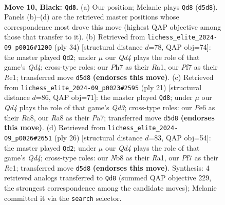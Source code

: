 \documentclass[11pt]{article}
\begin{document}
\clearpage

\begin{figure}[p]\centering
\begin{subfigure}{0.46\textwidth}\centering
\resizebox{\linewidth}{!}{%
\newchessgame
\chessboard[
  setfen={rnb2rk1/pp3ppp/4p3/2pq3n/2PP4/3BPN2/P4PPP/R1BQ1RK1 b - - 0 10},
  showmover=false,
  pgfstyle=straightmove, color=movearrow, markmove={d5-d8}
]}
\caption{}
\end{subfigure}\hfill
\begin{subfigure}{0.46\textwidth}\centering
\resizebox{\linewidth}{!}{%
\newchessgame
\chessboard[
  setfen={rq3rk1/1p1n1ppp/p1bp4/P3p3/3QP3/2N3P1/1PP2PBP/R3R1K1 w - - 0 18},
  showmover=false,
  pgfstyle=straightmove, color=movearrow, markmove={d4-d2}
]}
\caption{}
\end{subfigure}
\\[4pt]
\begin{subfigure}{0.46\textwidth}\centering
\resizebox{\linewidth}{!}{%
\newchessgame
\chessboard[
  setfen={r1b2rk1/ppp1ppbp/3q1np1/1BP5/3P4/5N1P/PP3PP1/R1BQ1RK1 b - - 0 11},
  showmover=false,
  pgfstyle=straightmove, color=movearrow, markmove={d6-d8}
]}
\caption{}
\end{subfigure}\hfill
\begin{subfigure}{0.46\textwidth}\centering
\resizebox{\linewidth}{!}{%
\newchessgame
\chessboard[
  setfen={r2q1rk1/1bpn1ppp/p2p1b2/1p6/3QPB2/2N2B1P/PPP2PP1/R3R1K1 w - - 6 14},
  showmover=false,
  pgfstyle=straightmove, color=movearrow, markmove={d4-d2}
]}
\caption{}
\end{subfigure}
\caption{\textbf{Move 10, Black: \texttt{Qd8}.} (a) Our position; Melanie plays \texttt{Qd8} (\texttt{d5d8}). Panels (b)--(d) are the retrieved master positions whose correspondence most drove this move (highest QAP objective among those that transfer to it). (b) Retrieved from \texttt{lichess\_elite\_2024-09\_p0016\#1200} (ply 34) [structural distance $d$=78, QAP obj=74]: the master played \texttt{Qd2}; under $\mu$ our \emph{Qd4} plays the role of that game's \emph{Qd4}; cross-type roles: our \emph{P}h7 as their \emph{R}a1, our \emph{P}f7 as their \emph{R}e1; transferred move \texttt{d5d8} \textbf{(endorses this move)}. (c) Retrieved from \texttt{lichess\_elite\_2024-09\_p0023\#2595} (ply 21) [structural distance $d$=86, QAP obj=71]: the master played \texttt{Qd8}; under $\mu$ our \emph{Qd4} plays the role of that game's \emph{Qd3}; cross-type roles: our \emph{P}e6 as their \emph{R}a8, our \emph{R}a8 as their \emph{P}a7; transferred move \texttt{d5d8} \textbf{(endorses this move)}. (d) Retrieved from \texttt{lichess\_elite\_2024-09\_p0026\#2651} (ply 26) [structural distance $d$=83, QAP obj=54]: the master played \texttt{Qd2}; under $\mu$ our \emph{Qd4} plays the role of that game's \emph{Qd4}; cross-type roles: our \emph{N}b8 as their \emph{R}a1, our \emph{P}f7 as their \emph{R}e1; transferred move \texttt{d5d8} \textbf{(endorses this move)}. Synthesis: 4 retrieved analogs transferred to \texttt{Qd8} (summed QAP objective 229, the strongest correspondence among the candidate moves); Melanie committed it via the \texttt{search} selector.}
\label{fig:thought-m19}
\end{figure}
\end{document}
